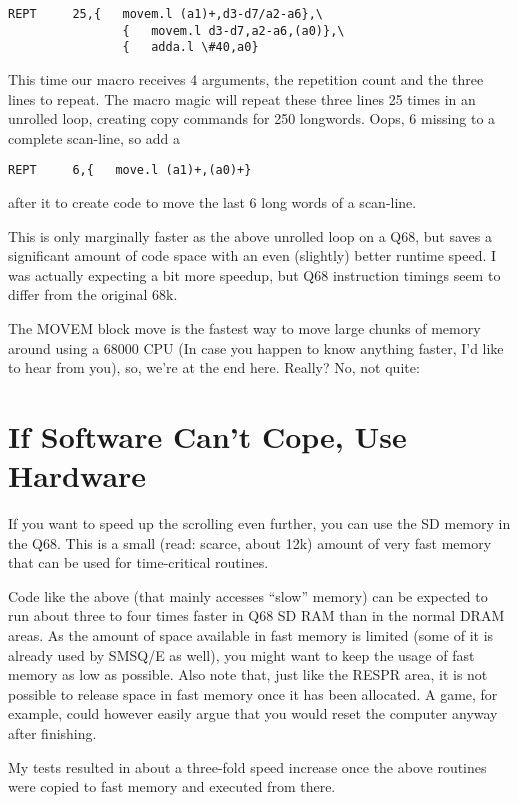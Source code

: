 \begin{lstlisting}[firstnumber=1,caption={Improving the REPT macro}]
    REPT     25,{   movem.l (a1)+,d3-d7/a2-a6},\
                {   movem.l d3-d7,a2-a6,(a0)},\
                {   adda.l \#40,a0}
\end{lstlisting}

This time our macro receives 4 arguments, the repetition count and the
three lines to repeat. The macro magic will repeat these three lines 25
times in an unrolled loop, creating copy commands for 250 longwords.
Oops, 6 missing to a complete scan-line, so add a

\begin{lstlisting}[firstnumber=1,caption={Scrolling one pixel leftwards}]
    REPT     6,{   move.l (a1)+,(a0)+}
\end{lstlisting}

after it to create code to move the last 6 long words of a scan-line.

This is only marginally faster as the above unrolled loop on a Q68, but
saves a significant amount of code space with an even (slightly) better
runtime speed. I was actually expecting a bit more speedup, but Q68
instruction timings seem to differ from the original 68k.

The MOVEM block move is the fastest way to move large chunks of memory
around using a 68000 CPU (In case you happen to know anything faster,
I'd like to hear from you), so, we're at the end here. Really? No, not
quite:

\section{If Software Can't Cope, Use Hardware}

If you want to speed up the scrolling even further, you can use the SD
memory in the Q68. This is a small (read: scarce, about 12k) amount of
very fast memory that can be used for time-critical routines.

Code like the above (that mainly accesses ``slow'' memory) can be
expected to run about three to four times faster in Q68 SD RAM than in
the normal DRAM areas. As the amount of space available in fast memory
is limited (some of it is already used by SMSQ/E as well), you might
want to keep the usage of fast memory as low as possible. Also note
that, just like the RESPR area, it is not possible to release space in
fast memory once it has been allocated. A game, for example, could however
easily argue that you would reset the computer anyway after finishing.

My tests resulted in about a three-fold speed increase once the above
routines were copied to fast memory and executed from there.

